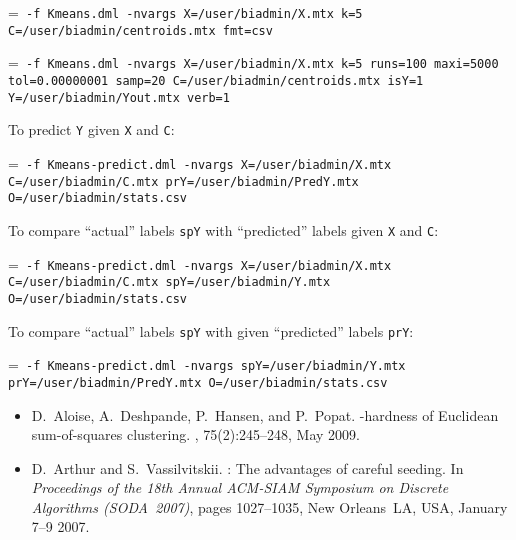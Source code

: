 \smallskip
{}
\smallskip

{\hangindent=\parindent\noindent\tt
\hml -f Kmeans.dml -nvargs X=/user/biadmin/X.mtx k=5 C=/user/biadmin/centroids.mtx fmt=csv

}

{\hangindent=\parindent\noindent\tt
\hml -f Kmeans.dml -nvargs X=/user/biadmin/X.mtx k=5 runs=100 maxi=5000 
tol=0.00000001 samp=20 C=/user/biadmin/centroids.mtx isY=1 Y=/user/biadmin/Yout.mtx verb=1

}
\noindent To predict {\tt Y} given {\tt X} and {\tt C}:

{\hangindent=\parindent\noindent\tt
\hml -f Kmeans-predict.dml -nvargs X=/user/biadmin/X.mtx
         C=/user/biadmin/C.mtx prY=/user/biadmin/PredY.mtx O=/user/biadmin/stats.csv

}
\noindent To compare ``actual'' labels {\tt spY} with ``predicted'' labels given {\tt X} and {\tt C}:

{\hangindent=\parindent\noindent\tt
\hml -f Kmeans-predict.dml -nvargs X=/user/biadmin/X.mtx
         C=/user/biadmin/C.mtx spY=/user/biadmin/Y.mtx O=/user/biadmin/stats.csv

}
\noindent To compare ``actual'' labels {\tt spY} with given ``predicted'' labels {\tt prY}:

{\hangindent=\parindent\noindent\tt
\hml -f Kmeans-predict.dml -nvargs spY=/user/biadmin/Y.mtx prY=/user/biadmin/PredY.mtx O=/user/biadmin/stats.csv

}

\smallskip
{}
\begin{itemize}
\item
D.~Aloise, A.~Deshpande, P.~Hansen, and P.~Popat.
-hardness of {E}uclidean sum-of-squares clustering.
, 75(2):245--248, May 2009.
\item
D.~Arthur and S.~Vassilvitskii.
: The advantages of careful seeding.
\newblock In {\em Proceedings of the 18th Annual {ACM-SIAM} Symposium on
  Discrete Algorithms ({SODA}~2007)}, pages 1027--1035, New Orleans~{LA},
  {USA}, January 7--9 2007.
\end{itemize}
